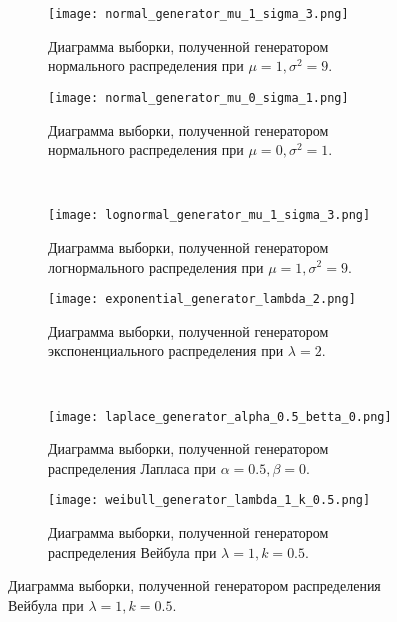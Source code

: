 \begin{figure}[!h]
	\centering
	\begin{subfigure}[b]{0.45\textwidth}
		\texttt{[image: normal\_generator\_mu\_1\_sigma\_3.png]}
		\caption{Диаграмма выборки, полученной генератором нормального распределения при $\mu = 1, \sigma^{2} = 9$.}
	\end{subfigure}
	\hfill
	\begin{subfigure}[b]{0.45\textwidth}
		\texttt{[image: normal\_generator\_mu\_0\_sigma\_1.png]}
		\caption{Диаграмма выборки, полученной генератором нормального распределения при $\mu = 0, \sigma^{2} = 1$.}
	\end{subfigure}
	\\
	\begin{subfigure}[b]{0.45\textwidth}
		\texttt{[image: lognormal\_generator\_mu\_1\_sigma\_3.png]}
		\caption{Диаграмма выборки, полученной генератором логнормального распределения при $\mu = 1, \sigma^{2} = 9$.}
	\end{subfigure}
	\hfill
	\begin{subfigure}[b]{0.45\textwidth}
		\texttt{[image: exponential\_generator\_lambda\_2.png]}
		\caption{Диаграмма выборки, полученной генератором экспоненциального распределения при $\lambda = 2$.}
	\end{subfigure}
	\\
	\begin{subfigure}[b]{0.45\textwidth}
		\texttt{[image: laplace\_generator\_alpha\_0.5\_betta\_0.png]}
		\caption{Диаграмма выборки, полученной генератором распределения Лапласа при $\alpha = 0.5, \beta = 0$.}
	\end{subfigure}
	\hfill
	\begin{subfigure}[b]{0.45\textwidth}
		\texttt{[image: weibull\_generator\_lambda\_1\_k\_0.5.png]}
		\caption{Диаграмма выборки, полученной генератором распределения Вейбула при $\lambda = 1, k = 0.5$.}
	\end{subfigure}
\end{figure}
